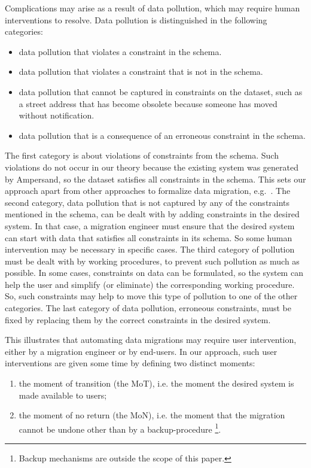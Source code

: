 \documentclass{elsarticle}
\begin{document}
   Complications may arise as a result of data pollution,
   which may require human interventions to resolve.
   Data pollution is distinguished in the following categories:
\begin{itemize}
   \item data pollution that violates a constraint in the schema.
   \item data pollution that violates a constraint that is not in the schema.
   \item data pollution that cannot be captured in constraints on the dataset,
   such as a street address that has become obsolete because someone has moved without notification.
   \item data pollution that is a consequence of an erroneous constraint in the schema.
\end{itemize}
   The first category is about violations of constraints from the schema.
   Such violations do not occur in our theory because the existing system was generated by Ampersand,
   so the dataset satisfies all constraints in the schema.
   This sets our approach apart from other approaches to formalize data migration, e.g.~\cite{Thalheim2013}.
   The second category, data pollution that is not captured by any of the constraints mentioned in the schema,
   can be dealt with by adding constraints in the desired system.
   In that case, a migration engineer must ensure that the desired system can start with data that satisfies all constraints in its schema.
   So some human intervention may be necessary in specific cases.
   The third category of pollution must be dealt with by working procedures, to prevent such pollution as much as possible.
   In some cases, constraints on data can be formulated,
   so the system can help the user and simplify (or eliminate) the corresponding working procedure.
   So, such constraints may help to move this type of pollution to one of the other categories.
   The last category of data pollution, erroneous constraints, must be fixed by replacing them by the correct constraints in the desired system.

   This illustrates that automating data migrations may require user intervention,
   either by a migration engineer or by end-users.
   In our approach, such user interventions are given some time by
   defining two distinct moments:
\begin{enumerate}
   \item the moment of transition (the MoT), i.e. the moment the desired system is made available to users;
   \item the moment of no return (the MoN), i.e. the moment that the migration cannot be undone other than by a backup-procedure%
\footnote{Backup mechanisms are outside the scope of this paper.}.
\end{enumerate}
\end{document}
